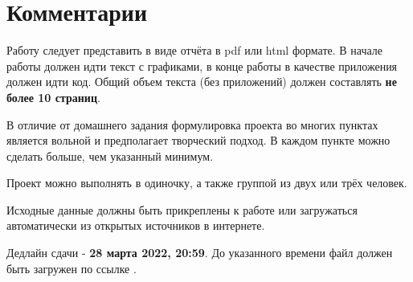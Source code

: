 \documentclass[12pt]{article}
\begin{document}
\section*{Комментарии}

Работу следует представить в виде отчёта в pdf или html формате. 
В начале работы должен идти текст с графиками, в конце работы в качестве приложения должен идти код. 
Общий объем текста (без приложений) должен составлять \textbf{не более 10 страниц}.

В отличие от домашнего задания формулировка проекта во многих пунктах является вольной и предполагает творческий подход. 
В каждом пункте можно сделать больше, чем указанный минимум.

Проект можно выполнять в одиночку, а также группой из двух или трёх человек. 

Исходные данные должны быть прикреплены к работе или загружаться автоматически из открытых источников в интернете.

Дедлайн сдачи - \textbf{28 марта 2022, 20:59}. До указанного времени файл должен быть загружен по ссылке
\url{}.
\end{document}
